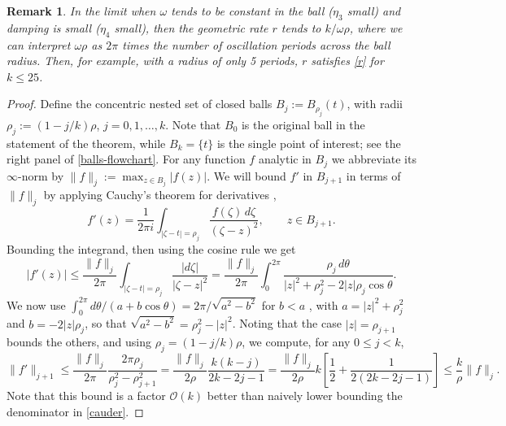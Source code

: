 \documentclass[10pt]{article}
\newcommand{\be}{\begin{equation}}
\newcommand{\ee}{\end{equation}}
\newcommand{\bigO}{{\mathcal O}}
\newtheorem{rmk}[thm]{Remark}
\newcommand{\om}{\omega}
\begin{document}
\begin{rmk}
  In the limit when $\om$ tends to be constant in the ball ($\eta_3$ small) and damping is small ($\eta_4$ small),
  then the geometric rate $r$ tends to $k/\om \rho$, where we can interpret $\om\rho$ as $2\pi$
  times the number of oscillation periods across the ball radius.
  Then, for example, with a radius of only 5 periods, $r$ satisfies \cref{r}
  for $k\le 25$.
\end{rmk}

\begin{proof}
  Define the concentric nested set of closed balls $B_j := B_{\rho_j}(t)$,
  with radii $\rho_j := (1-j/k)\rho$, $j=0,1,\dots,k$. Note that
  $B_0$ is the original ball in the statement of the theorem, while
    $B_k = \{t\}$ is the single point of interest; see the
    right panel of \cref{balls-flowchart}.
  For any function $f$ analytic in $B_j$ we abbreviate its $\infty$-norm by
  $\|f\|_j := \max_{z \in B_j}|f(z)|$.
  We will bound $f'$ in $B_{j+1}$ in terms of $\|f\|_j$ by
  applying Cauchy's theorem for derivatives
  \cite{steinshakarchi},
  \be
  f'(z) = \frac{1}{2\pi i} \int_{|\zeta-t|=\rho_j} \frac{f(\zeta)\, d\zeta}{(\zeta-z)^2}, \qquad z \in B_{j+1}.
  \label{cauder}
  \ee
  Bounding the integrand, then using the cosine rule we get
  $$
  |f'(z)| \le 
  \frac{\|f\|_j}{2\pi} \int_{|\zeta-t| = \rho_j} \frac{|d\zeta|}{|\zeta-z|^2}
  =
  \frac{\|f\|_j}{2\pi} \int_0^{2\pi} \frac{\rho_j\, d\theta}{|z|^2 + \rho_j^2 - 2|z|\rho_j \cos \theta}.
  $$
  We now use $\int_{0}^{2\pi} d\theta /(a + b \cos \theta) = 2\pi/\sqrt{a^2-b^2}$
  for $b<a$ \cite[Eq.~3.613.1]{GR8}, with
  $a = |z|^2 + \rho_j^2$ and $b = -2|z|\rho_j$, so that
  $\sqrt{a^2-b^2} = \rho_j^2-|z|^2$.
  Noting that the case $|z| = \rho_{j+1}$ bounds the others,
  and using $\rho_j=(1-j/k)\rho$, we compute, for any $0\le j < k$,
  \be
  \|f'\|_{j+1} \le
  \frac{\|f\|_j}{2\pi} \frac{2\pi\rho_j}{\rho_j^2-\rho_{j+1}^2}
  =
  \frac{\|f\|_j}{2 \rho} \frac{k(k-j)}{2k-2j-1}
  =
  \frac{\|f\|_j}{2 \rho} k \left[ \frac{1}{2} + \frac{1}{2(2k-2j-1)}\right]
  \le
  \frac{k}{\rho}\|f\|_j.
  \label{derbnd}
  \ee
  Note that this bound is a factor $\bigO(k)$ better than naively
  lower bounding the denominator in \cref{cauder}.
  

\end{proof}
\end{document}
